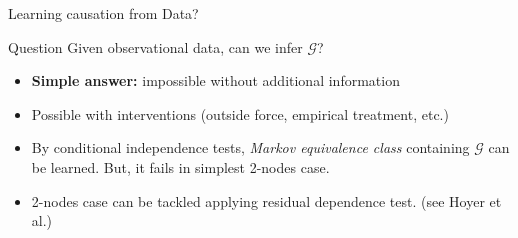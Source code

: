 \begin{frame}{Learning causation from Data?}
\begin{block}{Question}
Given observational data, can we infer $\mathcal{G}$?
\end{block}
\begin{itemize}
\item \textbf{Simple answer:} impossible without additional information
\item Possible with interventions (outside force, empirical treatment, etc.)
\item By conditional independence tests, \textit{Markov equivalence class} containing $\mathcal{G}$ can be learned. \alert{But}, it fails in simplest 2-nodes case.
\item 2-nodes case can be tackled applying residual dependence test. (see Hoyer et al.)
\end{itemize}
\end{frame}
